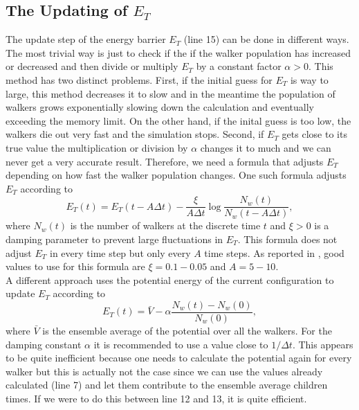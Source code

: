 \documentclass [12pt]{report}
\begin{document}
\subsection{The Updating of $E_T$}
The update step of the energy barrier $E_T$ (line 15) can be done in different ways. The most trivial way is just to check if the if the walker population has increased or decreased and then divide or multiply $E_T$ by a constant factor $\alpha > 0$. This method has two distinct problems. First, if the initial guess for $E_T$ is way to large, this method decreases it to slow and in the meantime the population of walkers grows exponentially slowing down the calculation and eventually exceeding the memory limit. On the other hand, if the inital guess is too low, the walkers die out very fast and the simulation stops. Second, if $E_T$ gets close to its true value the multiplication or division by $\alpha$ changes it to much and we can never get a very accurate result. Therefore, we need a formula that adjusts $E_T$ depending on how fast the walker population changes. One such formula \cite{alavi} adjusts $E_T$ according to
\begin{equation}\label{eq:2.8} 
E_T(t) = E_T(t-A \Delta t) - \frac{\xi}{A \Delta t} \log{\frac{N_w(t)}{N_w(t-A \Delta t)}},
\end{equation}
where $N_w(t)$ is the number of walkers at the discrete time $t$ and $\xi > 0$ is a damping parameter to prevent large fluctuations in $E_T$. This formula does not adjust $E_T$ in every time step but only every $A$ time steps. As reported in \cite{alavi}, good values to use for this formula are $\xi = 0.1 - 0.05$ and $A = 5 - 10$.\\
A different approach \cite{mccoy} uses the potential energy of the current configuration to update $E_T$ according to
\begin{equation}\label{eq:2.9} 
E_T(t) = \bar{V} - \alpha \frac{N_w(t)-N_w(0)}{N_w(0)},
\end{equation}
where $\bar{V}$ is the ensemble average of the potential over all the walkers. For the damping constant $\alpha$ it is recommended to use a value close to $1/\Delta t$. This appears to be quite inefficient because one needs to calculate the potential again for every walker but this is actually not the case since we can use the values already calculated (line 7) and let them contribute to the ensemble average children times. If we were to do this between line 12 and 13, it is quite efficient.
\end{document}
